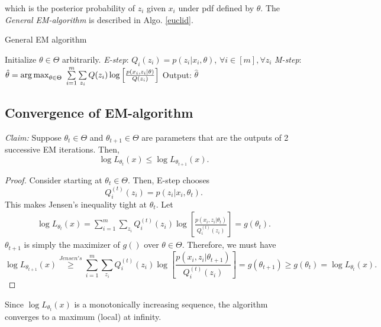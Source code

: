 \documentclass[a4paper,english,12pt]{article}
\begin{document}
which is the posterior probability of $z_i$ given $x_i$ under pdf defined by $\theta$. The \textit{General EM-algorithm} is described in Algo. \ref{euclid}.
\begin{algorithm}
\caption{General EM algorithm}\label{euclid}
\begin{algorithmic}[1]
\State Initialize  $\theta \in \Theta$ arbitrarily.
\State \emph{E-step}:
\State $Q_i(z_i) = p(z_i|x_i, \theta)$, $\forall i \in [m], \forall z_i$
\State \emph{M-step}: 
\State $\hat{\theta}= \operatorname*{arg\,max}_{\theta \in \Theta} ~\sum\limits_{i=1}^m \sum\limits_{z_i}Q(z_i)\log \left[ \frac{p(x_i,z_i|\theta)}{Q(z_i)} \right]$  
\EndWhile
\State Output: $\hat{\theta}$
\end{algorithmic}
\end{algorithm}
\subsection{Convergence of EM-algorithm}
\textit{Claim:} Suppose $\theta_t \in \Theta$ and $\theta_{t+1} \in \Theta $ are parameters that are the outputs of 2 successive EM iterations. Then,
\begin{equation*}
\log L_{\theta_t}(x)\leq \log L_{\theta_{t+1}}(x).
\end{equation*}
\begin{proof}
Consider starting at $\theta_t \in \Theta $. Then, E-step chooses $$Q_i^{(t)}(z_i) = p(z_i|x_i,\theta_t).$$This makes Jensen's inequality tight at $\theta_t$. Let
\begin{eqnarray*}
\log L_{\theta_t} (x) = \sum\limits_{i=1}^m \sum\limits_{z_i}Q_i^{(t)}(z_i)\log \left[ \frac{p(x_i,z_i|\theta_t)}{Q_i^{(t)}(z_i)} \right] = g(\theta_t).
\end{eqnarray*}
$\theta_{t+1}$ is simply the maximizer of $g()$ over $\theta \in \Theta$. Therefore, we must have $$\log L_{\theta_{t+1}} (x) \overset{Jensen's}{\geq} \sum\limits_{i=1}^m \sum\limits_{z_i}Q_i^{(t)}(z_i)\log \left[ \frac{p(x_i,z_i|\theta_{t+1})}{Q_i^{(t)}(z_i)} \right] = g(\theta_{t+1}) \geq g(\theta_t) = \log L_{\theta_t} (x).$$
\end{proof}
Since $\log L_{\theta_t} (x)$ is a monotonically increasing sequence, the algorithm converges to a maximum (local) at infinity.
\end{document}

